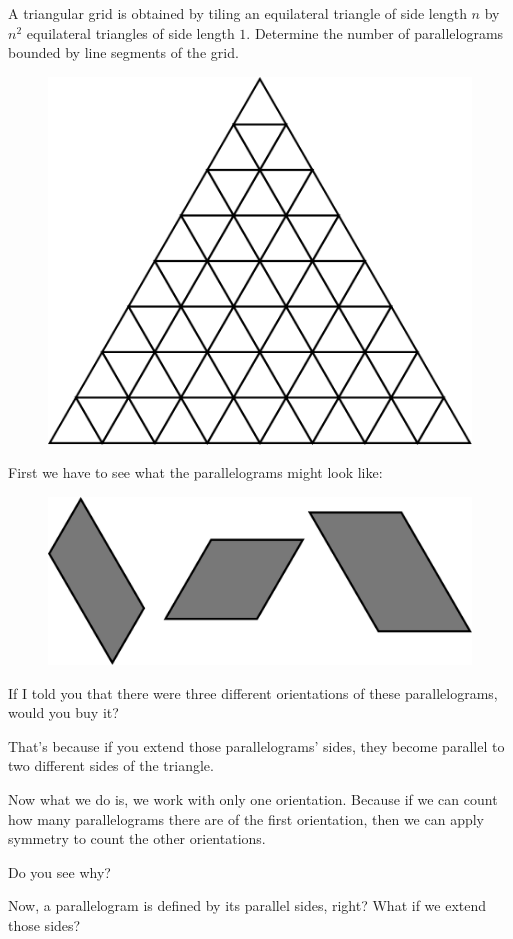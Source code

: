 \documentclass[compress]{beamer}
\begin{document}
\begin{frame}
    \textcolor{NordOrange}{
        A triangular grid is obtained by tiling
        an equilateral triangle of side length $n$ by $n^{2}$ equilateral
        triangles of side length $1 .$ Determine the number of parallelograms
        bounded by line segments of the grid.
    }

    \begin{figure}
        \begin{center}
            \includegraphics[width=.4\linewidth]{trig_grid_1.pdf}
        \end{center}
    \end{figure}
\end{frame}

\begin{frame}
    First we have to see what the parallelograms might look like:
 
   \begin{figure}
        \begin{center}
            \includegraphics[width=.4\linewidth]{trig_grid_3.pdf}
        \end{center}
    \end{figure}

    \pause\vspace{1em}

    If I told you that there were three different orientations of these
    parallelograms, would you buy it?

    \pause\vspace{1em}

    That's because if you extend those parallelograms' sides, they become
    parallel to two different sides of the triangle. 
\end{frame}


\begin{frame}
    Now what we do is, we work with only one orientation. Because
    \textcolor{NordBrightBlue}{if we can count how many parallelograms there
    are of the first orientation, then we can apply symmetry to count the
    other orientations.}

    \pause\vspace{1em}

    Do you see why?

    \pause\vspace{1em}

    Now, a parallelogram is defined by its parallel sides, right? What if we
    extend those sides?
\end{frame}
\end{document}
